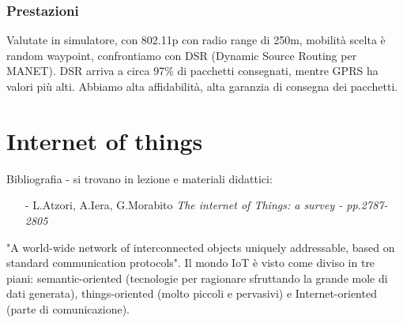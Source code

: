 \documentclass[12pt,italian]{report}
\begin{document}
\subsection{Prestazioni}
Valutate in simulatore, con 802.11p con radio range di 250m, mobilità scelta è random waypoint, confrontiamo con DSR (Dynamic Source Routing per MANET). DSR arriva a circa 97\% di pacchetti consegnati, mentre GPRS ha valori più alti. Abbiamo alta affidabilità, alta garanzia di consegna dei pacchetti.  

\chapter{Internet of things}
Bibliografia - si trovano in lezione e materiali didattici: 
\begin{itemize}
    \item[-] L.Atzori, A.Iera, G.Morabito 
    \textit{The internet of Things: a survey - pp.2787-2805}
\end{itemize}
"A world-wide network of interconnected objects uniquely addressable, based on standard communication protocols". 
\bigbreak
Il mondo IoT è visto come diviso in tre piani: semantic-oriented (tecnologie per ragionare sfruttando la grande mole di dati generata), things-oriented (molto piccoli e pervasivi) e Internet-oriented (parte di comunicazione).
\bigbreak
\end{document}

